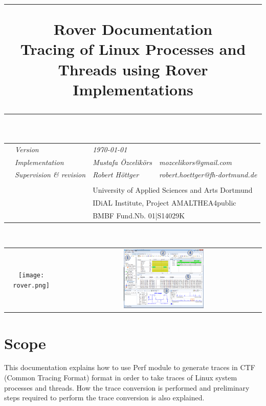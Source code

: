 


\title{\rule{\textwidth}{1pt}\textbf{ Rover Documentation} \\ Tracing of Linux Processes and Threads using Rover Implementations \rule{\textwidth}{1pt}\vspace{-20pt}}
\date{}
\maketitle 
\setlength{\headsep}{20pt}
\vspace{-20pt}
\begin{tabularx}{\textwidth}{Xlll}
	& \textit{Version} & \textit{\today }&\\
	&\textit{Implementation} &\textit{Mustafa Özcelikörs} & \textit{mozcelikors@gmail.com}\\
	&\textit{Supervision \& revision} &\textit{Robert Höttger} &\textit{robert.hoettger@fh-dortmund.de}\\ \\
	&&\multicolumn{2}{l}{University of Applied Sciences and Arts Dortmund}\\ 
	&&\multicolumn{2}{l}{IDiAL Institute, Project AMALTHEA4public}\\
	&&\multicolumn{2}{l}{BMBF  	Fund.Nb. 01|S14029K} 
\end{tabularx} 
\vspace{15pt}\\
\begin{tabularx}{\textwidth}{cXc}
		\texttt{[image: rover.png]}&&
		\includegraphics[width=0.42\textwidth]{tracecompass.png}
\end{tabularx}

\section{Scope}
This documentation explains how to use Perf module to generate traces in CTF (Common Tracing Format) format in order to take traces of Linux system processes and threads. How the trace conversion is performed and preliminary steps required to perform the trace conversion is also explained.

